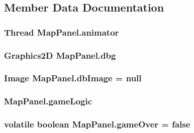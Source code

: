 \subsection{Member Data Documentation}
\hypertarget{classMapPanel_a2f4861c001b00d173bbad5573eb7fda7}{
\subsubsection[{animator}]{\setlength{\rightskip}{0pt plus 5cm}Thread Map\-Panel.\-animator\hspace{0.3cm}{\ttfamily [private]}}}\label{classMapPanel_a2f4861c001b00d173bbad5573eb7fda7}
\hypertarget{classMapPanel_ad691832c9f6f90db5bed90f359ce46fc}{
\subsubsection[{dbg}]{\setlength{\rightskip}{0pt plus 5cm}Graphics2\-D Map\-Panel.\-dbg\hspace{0.3cm}{\ttfamily [private]}}}\label{classMapPanel_ad691832c9f6f90db5bed90f359ce46fc}
\hypertarget{classMapPanel_aad322f3de5764d74d0da0ee2862e1da4}{
\subsubsection[{db\-Image}]{\setlength{\rightskip}{0pt plus 5cm}Image Map\-Panel.\-db\-Image = null\hspace{0.3cm}{\ttfamily [private]}}}\label{classMapPanel_aad322f3de5764d74d0da0ee2862e1da4}
\hypertarget{classMapPanel_a2ea62977a77f6de53552a52d7f99bb9e}{
\subsubsection[{game\-Logic}]{ Map\-Panel.\-game\-Logic\hspace{0.3cm}{\ttfamily [private]}}}\label{classMapPanel_a2ea62977a77f6de53552a52d7f99bb9e}
\hypertarget{classMapPanel_afaa79c91a69c6ce1e1edd062e066da06}{
\subsubsection[{game\-Over}]{\setlength{\rightskip}{0pt plus 5cm}volatile boolean Map\-Panel.\-game\-Over = false\hspace{0.3cm}{\ttfamily [private]}}}\label{classMapPanel_afaa79c91a69c6ce1e1edd062e066da06}
